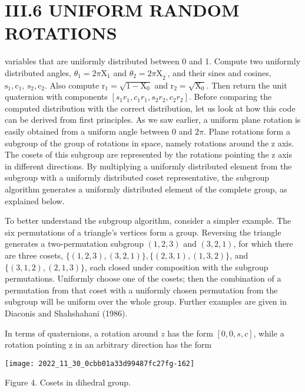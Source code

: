\section{III.6 UNIFORM RANDOM ROTATIONS}
variables that are uniformly distributed between 0 and 1. Compute two uniformly distributed angles, $\theta_{1}=2 \pi \mathrm{X}_{1}$ and $\theta_{2}=2 \pi \mathrm{X}_{2^{\prime}}$, and their sines and cosines, $\mathrm{s}_{1}, \mathrm{c}_{1}, \mathrm{~s}_{2}, \mathrm{c}_{2}$. Also compute $\mathrm{r}_{1}=\sqrt{1-\mathrm{X}_{0}}$ and $\mathrm{r}_{2}=\sqrt{\mathrm{X}_{0}}$. Then return the unit quaternion with components $\left[s_{1} r_{1}, c_{1} r_{1}, s_{2} r_{2}, c_{2} r_{2}\right]$. Before comparing the computed distribution with the correct distribution, let us look at how this code can be derived from first principles. As we saw earlier, a uniform plane rotation is easily obtained from a uniform angle between 0 and $2 \pi$. Plane rotations form a subgroup of the group of rotations in space, namely rotations around the $\mathrm{z}$ axis. The cosets of this subgroup are represented by the rotations pointing the $\mathrm{z}$ axis in different directions. By multiplying a uniformly distributed element from the subgroup with a uniformly distributed coset representative, the subgroup algorithm generates a uniformly distributed element of the complete group, as explained below.

To better understand the subgroup algorithm, consider a simpler example. The six permutations of a triangle's vertices form a group. Reversing the triangle generates a two-permutation subgroup $(1,2,3)$ and $(3,2,1)$, for which there are three cosets, $\{(1,2,3),(3,2,1)\},\{(2,3,1),(1,3,2)\}$, and $\{(3,1,2),(2,1,3)\}$, each closed under composition with the subgroup permutations. Uniformly choose one of the cosets; then the combination of a permutation from that coset with a uniformly chosen permutation from the subgroup will be uniform over the whole group. Further examples are given in Diaconis and Shahshahani (1986).

In terms of quaternions, a rotation around $z$ has the form $[0,0, s, c]$, while a rotation pointing $\mathrm{z}$ in an arbitrary direction has the form

\begin{center}
\texttt{[image: 2022\_11\_30\_0cbb01a33d99487fc27fg-162]}
\end{center}

Figure 4. Cosets in dihedral group.

